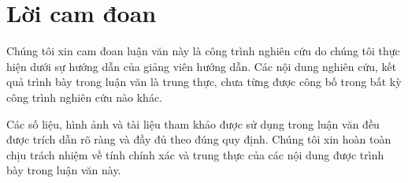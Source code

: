 \cleardoublepage
\section*{Lời cam đoan}
Chúng tôi xin cam đoan luận văn này là công trình nghiên cứu do chúng tôi thực hiện dưới sự
hướng dẫn của giảng viên hướng dẫn. Các nội dung nghiên cứu, kết quả trình bày trong luận văn
là trung thực, chưa từng được công bố trong bất kỳ công trình nghiên cứu nào khác.

Các số liệu, hình ảnh và tài liệu tham khảo được sử dụng trong luận văn đều được trích dẫn rõ
ràng và đầy đủ theo đúng quy định. Chúng tôi xin hoàn toàn chịu trách nhiệm về tính chính xác
và trung thực của các nội dung được trình bày trong luận văn này.
